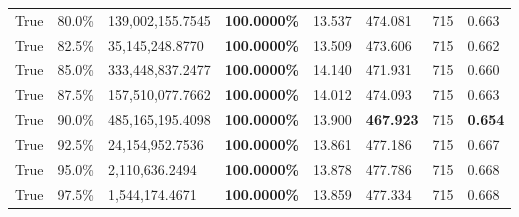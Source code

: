 \begin{table}[H]
\begin{tabular}{lllrllll}
\cline{1-8}
True & 80.0\% & 139,002,155.7545 & \bfseries \color{red} 100.0000\% & 13.537 & 474.081 & 715 & 0.663 \\
\cline{1-8}
True & 82.5\% & 35,145,248.8770 & \bfseries \color{red} 100.0000\% & 13.509 & 473.606 & 715 & 0.662 \\
\cline{1-8}
True & 85.0\% & 333,448,837.2477 & \bfseries \color{red} 100.0000\% & 14.140 & 471.931 & 715 & 0.660 \\
\cline{1-8}
True & 87.5\% & 157,510,077.7662 & \bfseries \color{red} 100.0000\% & 14.012 & 474.093 & 715 & 0.663 \\
\cline{1-8}
True & 90.0\% & 485,165,195.4098 & \bfseries \color{red} 100.0000\% & 13.900 & \bfseries \color{red} 467.923 & 715 & \bfseries \color{red} 0.654 \\
\cline{1-8}
True & 92.5\% & 24,154,952.7536 & \bfseries \color{red} 100.0000\% & 13.861 & 477.186 & 715 & 0.667 \\
\cline{1-8}
True & 95.0\% & 2,110,636.2494 & \bfseries \color{red} 100.0000\% & 13.878 & 477.786 & 715 & 0.668 \\
\cline{1-8}
True & 97.5\% & 1,544,174.4671 & \bfseries \color{red} 100.0000\% & 13.859 & 477.334 & 715 & 0.668 \\
\cline{1-8}
\bottomrule
\end{tabular}
\end{table}
